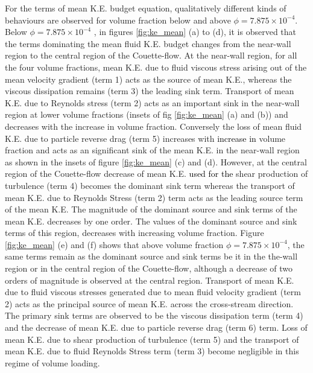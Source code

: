 \documentclass[aip,graphicx]{revtex4-1}
\begin{document}
For the terms of mean K.E. budget equation, qualitatively different kinds of behaviours are observed for volume fraction below and above $\phi=7.875\times10^{-4}$. Below $\phi=7.875\times10^{-4}$ , in figures \ref{fig:ke_mean} (a) to (d), it is observed that the terms dominating the mean fluid K.E. budget changes from the near-wall region to the central region of the Couette-flow. At the near-wall region, for all the four volume fractions, mean K.E. due to fluid viscous stress arising out of the mean velocity gradient (term 1) acts as the source of mean K.E., whereas the viscous dissipation remains (term 3) the leading sink term. Transport of mean K.E. due to Reynolds stress (term 2) acts as an important sink in the near-wall region at lower volume fractions (insets of fig \ref{fig:ke_mean} (a) and (b)) and decreases with the increase in volume fraction. Conversely the loss of mean fluid K.E. due to particle reverse drag (term 5) increases with \textcolor{black}{increase in} volume fraction and acts as an significant sink of the mean K.E. in the near-wall region as shown in the insets of figure \ref{fig:ke_mean} (c) and (d). However, at the central region of the Couette-flow decrease of mean K.E. \textcolor{black}{used for the} shear production of turbulence (term 4) becomes the dominant sink term whereas the transport of mean K.E. due to Reynolds Stress (term 2) term acts as the leading source term of the mean K.E. The magnitude of the dominant source and sink terms of the mean K.E. decreases by one order. The values of the dominant source and sink terms of this region, decreases with increasing volume fraction.  
Figure \ref{fig:ke_mean} (e) and (f) shows that above volume fraction $\phi=7.875\times10^{-4}$, the same terms remain as the dominant source and sink terms be it in the the-wall region or in the central region of the Couette-flow, although a decrease of two orders of magnitude is observed at the central region. Transport of mean K.E. due to fluid viscous stresses generated due to mean fluid velocity gradient (term 2) acts as the principal source of mean K.E. across the cross-stream direction. The primary sink terms are observed to be the viscous dissipation term (term 4) and the decrease of mean K.E. due to particle reverse drag (term 6) term. Loss of mean K.E. due to shear production of turbulence (term 5) and the transport of mean K.E. due to fluid Reynolds Stress term (term 3) become negligible in this regime of volume loading.      
\end{document}

